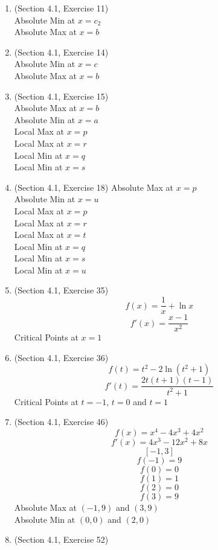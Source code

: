 \documentclass{article}
\begin{document}
\begin{enumerate}
    \item (Section 4.1, Exercise 11) \\
        Absolute Min at $x = c_2$ \\
        Absolute Max at $x = b$
    \item (Section 4.1, Exercise 14) \\
        Absolute Min at $x = c$ \\
        Absolute Max at $x = b$
    \item (Section 4.1, Exercise 15) \\
        Absolute Max at $x = b$ \\
        Absolute Min at $x = a$ \\
        Local Max at $x = p$ \\
        Local Max at $x = r$ \\
        Local Min at $x = q$ \\
        Local Min at $x = s$
    \item (Section 4.1, Exercise 18)
        Absolute Max at $x = p$ \\
        Absolute Min at $x = u$ \\
        Local Max at $x = p$ \\
        Local Max at $x = r$ \\
        Local Max at $x = t$ \\
        Local Min at $x = q$ \\
        Local Min at $x = s$ \\
        Local Min at $x = u$ \\
    \item (Section 4.1, Exercise 35)
        $$f(x) = \frac{1}{x} + \ln{x}$$
        $$f'(x) = \frac{x-1}{x^2}$$
        Critical Points at $x = 1$
    \item (Section 4.1, Exercise 36)
        $$f(t) = t^2 - 2\ln{\left(t^2 + 1\right)}$$
        $$f'(t) = \frac{2t\left(t+1\right)\left(t-1\right)}{t^2 + 1}$$
        Critical Points at $t = -1$, $t = 0$ and $t = 1$
    \item (Section 4.1, Exercise 46)
        $$f(x) = x^4 - 4x^3 + 4x^2$$
        $$f'(x) = 4x^3 - 12x^2 + 8x$$
        $$[-1, 3]$$
        $$f(-1) = 9$$
        $$f(0) = 0$$
        $$f(1) = 1$$
        $$f(2) = 0$$
        $$f(3) = 9$$
        Absolute Max at $(-1, 9)$ and $(3, 9)$ \\
        Absolute Min at $(0, 0)$ and $(2, 0)$ \\
    \item (Section 4.1, Exercise 52)

\end{enumerate}
\end{document}
